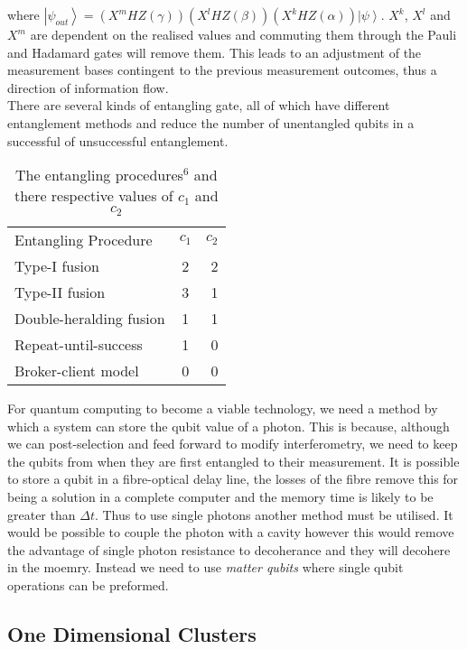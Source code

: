 \documentclass{article}
\numberwithin{equation}{section} %
\newcommand{\ket}[1]{\left| #1 \right>} %
\begin{document}
where $\ket{\psi _{out}}=(X^mHZ(\gamma))(X^lHZ(\beta))(X^kHZ(\alpha))\ket{\psi}$. $X^k$, $X^l$ and $X^m$ are dependent on the realised values and commuting them through the Pauli and Hadamard gates will remove them. This leads to an adjustment of the measurement bases contingent to the previous measurement outcomes, thus a direction of information flow. \\
           
 
 There are several kinds of entangling gate, all of which have different entanglement methods and reduce the number of unentangled qubits in a successful of unsuccessful entanglement. 
 
\begin{table}[h]
\begin{center}\begin{tabular}{l    c     r}
\hline
Entangling Procedure & $c_1$ & $c_2$\\
\cline{1-3}
Type-I fusion & 2 & 2 \\
Type-II fusion & 3 & 1 \\
Double-heralding fusion & 1 & 1 \\
Repeat-until-success & 1 & 0 \\
Broker-client model & 0 & 0 \\
\hline
\end{tabular}\end{center}
\caption{The entangling procedures$^6$ and there respective values of $c_1$ and $c_2$}
\label{tab: align}
\end{table} 

\vskip 0.2in

For quantum computing to become  a viable technology, we need a method by which a system can store the qubit value of a photon. This is because, although we can post-selection and feed forward to modify interferometry, we need to keep the qubits from when they are first entangled to their measurement. It is possible to store a qubit in a fibre-optical delay line, the losses of the fibre remove this for being a solution in a complete computer and the memory time is likely to be greater than $\Delta t$. Thus to use single photons another method must be utilised. It would be possible to couple the photon with a cavity however this would remove the advantage of single photon resistance to decoherance and they will decohere in the moemry. Instead we need to use \emph{matter qubits} where single qubit operations can be preformed. 

\subsection{One Dimensional Clusters} 
                     
\end{document}
